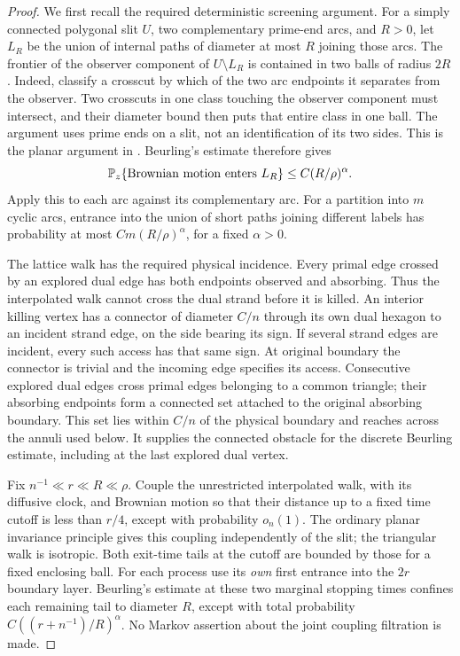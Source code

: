 \begin{proof}
We first recall the required deterministic screening argument.
For a simply connected polygonal slit $U$, two complementary
prime-end arcs, and $R>0$, let $L_R$ be the union of internal
paths of diameter at most $R$ joining those arcs. The frontier
of the observer component of $U\setminus L_R$ is contained in
two balls of radius $2R$. Indeed, classify a crosscut by which
of the two arc endpoints it separates from the observer.
Two crosscuts in one class touching the observer component
must intersect, and their diameter bound then puts that entire
class in one ball. The argument uses prime ends on a slit,
not an identification of its two sides. This is the planar
argument in \cite[equation (3.55)]{SSdiscrete}.
Beurling's estimate therefore gives
\[
 \mathbb P_z\{\text{Brownian motion enters }L_R\}
       \le C(R/\rho)^\alpha .
\]
Apply this to each arc against its complementary arc. For a
partition into $m$ cyclic arcs, entrance into the union of
short paths joining different labels has probability at most
$Cm(R/\rho)^\alpha$, for a fixed $\alpha>0$.

The lattice walk has the required physical incidence. Every
primal edge crossed by an explored dual edge has both endpoints
observed and absorbing. Thus the interpolated walk cannot cross
the dual strand before it is killed. An interior killing vertex
has a connector of diameter $C/n$ through its own dual hexagon
to an incident strand edge, on the side bearing its sign.
If several strand edges are incident, every such access has
that same sign. At original boundary the connector is trivial
and the incoming edge specifies its access. Consecutive explored
dual edges cross primal edges belonging to a common triangle;
their absorbing endpoints form a connected set attached to the
original absorbing boundary. This set lies within $C/n$ of
the physical boundary and reaches across the annuli used below.
It supplies the connected obstacle for the discrete Beurling
estimate, including at the last explored dual vertex.

Fix $n^{-1}\ll r\ll R\ll\rho$. Couple the unrestricted
interpolated walk, with its diffusive clock, and Brownian motion
so that their distance up to a fixed time cutoff is less than
$r/4$, except with probability $o_n(1)$. The ordinary planar
invariance principle gives this coupling independently of the
slit; the triangular walk is isotropic. Both exit-time tails
at the cutoff are bounded by those for a fixed enclosing ball.
For each process use its \emph{own} first entrance into the
$2r$ boundary layer. Beurling's estimate at these two marginal
stopping times confines each remaining tail to diameter $R$,
except with total probability $C((r+n^{-1})/R)^\alpha$.
No Markov assertion about the joint coupling filtration is made.


\end{proof}
